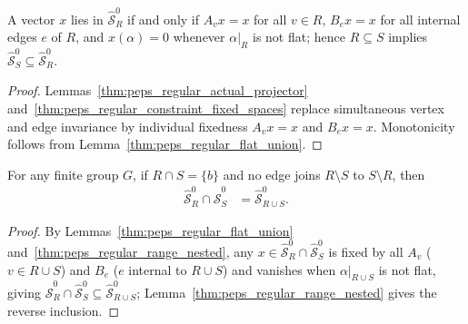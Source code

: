 \begin{lemma}%
    \label{thm:peps_regular_range_nested}
    \leanok
    A vector $x$ lies in $\widehat{\mathcal S}_R^0$ if and only if
    $A_vx=x$ for all $v\in R$, $B_ex=x$ for all internal edges $e$ of $R$,
    and $x(\alpha)=0$ whenever $\alpha|_R$ is not flat; hence
    $R\subseteq S$ implies
    $\widehat{\mathcal S}_S^0\subseteq\widehat{\mathcal S}_R^0$.
\end{lemma}
\begin{proof}\leanok
    Lemmas~\ref{thm:peps_regular_actual_projector}
    and~\ref{thm:peps_regular_constraint_fixed_spaces} replace simultaneous
    vertex and edge invariance by individual fixedness $A_vx=x$ and
    $B_ex=x$. Monotonicity follows from Lemma~\ref{thm:peps_regular_flat_union}.
\end{proof}

\begin{lemma}%
    \label{thm:peps_regular_region_intersection}
    \leanok
    For any finite group $G$, if $R\cap S=\{b\}$ and no edge joins
    $R\setminus S$ to $S\setminus R$, then
    \begin{align}
        \widehat{\mathcal S}_R^0\cap\widehat{\mathcal S}_S^0
         & =\widehat{\mathcal S}_{R\cup S}^0.
        \label{eq:peps_regular_region_intersection}
    \end{align}
\end{lemma}
\begin{proof}\leanok
    By Lemmas~\ref{thm:peps_regular_flat_union}
    and~\ref{thm:peps_regular_range_nested}, any
    $x\in\widehat{\mathcal S}_R^0\cap\widehat{\mathcal S}_S^0$ is fixed by
    all $A_v$ ($v\in R\cup S$) and $B_e$ ($e$ internal to $R\cup S$) and
    vanishes when $\alpha|_{R\cup S}$ is not flat, giving
    $\widehat{\mathcal S}_R^0\cap\widehat{\mathcal S}_S^0\subseteq\widehat{\mathcal S}_{R\cup S}^0$;
    Lemma~\ref{thm:peps_regular_range_nested} gives the reverse inclusion.
\end{proof}

